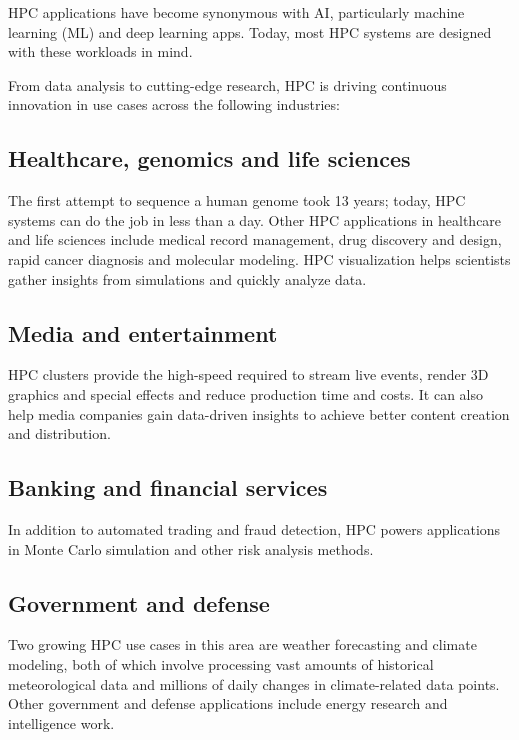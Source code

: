 \documentclass[11pt]{article}
\begin{document}
HPC applications have become synonymous with AI, particularly machine learning (ML) and deep learning apps. Today, most HPC systems are designed with these workloads in mind.

From data analysis to cutting-edge research, HPC is driving continuous innovation in use cases across the following industries:

\subsection{Healthcare, genomics and life sciences}

The first attempt to sequence a human genome took 13 years; today, HPC systems can do the job in less than a day. Other HPC applications in healthcare and life sciences include medical record management, drug discovery and design, rapid cancer diagnosis and molecular modeling. HPC visualization helps scientists gather insights from simulations and quickly analyze data.

\subsection{Media and entertainment}

HPC clusters provide the high-speed required to stream live events, render 3D graphics and special effects and reduce production time and costs. It can also help media companies gain data-driven insights to achieve better content creation and distribution.

\subsection{Banking and financial services}

In addition to automated trading and fraud detection, HPC powers applications in Monte Carlo simulation and other risk analysis methods.

\subsection{Government and defense}

Two growing HPC use cases in this area are weather forecasting and climate modeling, both of which involve processing vast amounts of historical meteorological data and millions of daily changes in climate-related data points. Other government and defense applications include energy research and intelligence work.
\end{document}
